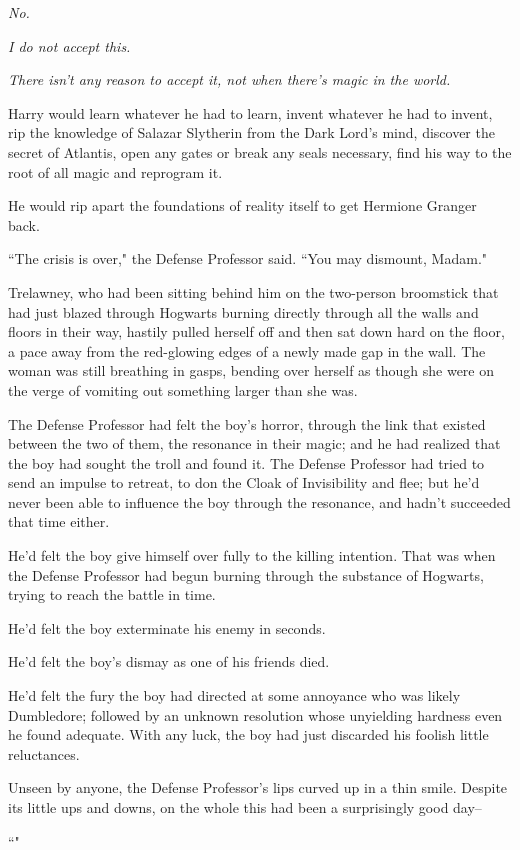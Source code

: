 \emph{No.}

\emph{I do not accept this.}

\emph{There isn't any reason to accept it, not when there's magic in the world.}

Harry would learn whatever he had to learn, invent whatever he had to invent, rip the knowledge of Salazar Slytherin from the Dark Lord's mind, discover the secret of Atlantis, open any gates or break any seals necessary, find his way to the root of all magic and reprogram it.

He would rip apart the foundations of reality itself to get Hermione Granger back.

\later

``The crisis is over," the Defense Professor said. ``You may dismount, Madam."

Trelawney, who had been sitting behind him on the two-person broomstick that had just blazed through Hogwarts burning directly through all the walls and floors in their way, hastily pulled herself off and then sat down hard on the floor, a pace away from the red-glowing edges of a newly made gap in the wall. The woman was still breathing in gasps, bending over herself as though she were on the verge of vomiting out something larger than she was.

The Defense Professor had felt the boy's horror, through the link that existed between the two of them, the resonance in their magic; and he had realized that the boy had sought the troll and found it. The Defense Professor had tried to send an impulse to retreat, to don the Cloak of Invisibility and flee; but he'd never been able to influence the boy through the resonance, and hadn't succeeded that time either.

He'd felt the boy give himself over fully to the killing intention. That was when the Defense Professor had begun burning through the substance of Hogwarts, trying to reach the battle in time.

He'd felt the boy exterminate his enemy in seconds.

He'd felt the boy's dismay as one of his friends died.

He'd felt the fury the boy had directed at some annoyance who was likely Dumbledore; followed by an unknown resolution whose unyielding hardness even he found adequate. With any luck, the boy had just discarded his foolish little reluctances.

Unseen by anyone, the Defense Professor's lips curved up in a thin smile. Despite its little ups and downs, on the whole this had been a surprisingly good day\---

``"

